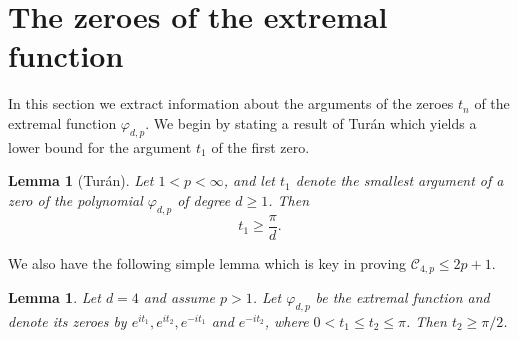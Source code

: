 \documentclass{amsart}
\theoremstyle{plain}
\newtheorem{lemma}[theorem]{Lemma}
\theoremstyle{remark}
\begin{document}
	\section{The zeroes of the extremal function}\label{sec:tn}
	In this section we extract information about the arguments of the zeroes $t_n$ of the extremal function $\varphi_{d, p}$.
	We begin by stating a result of Turán \cite[Theorem 3]{Turan} which yields a lower bound for the argument $t_1$ of the first zero.
	\begin{lemma}[Turán]\label{lem:Turan}
		Let $1 <p < \infty$, and let $t_1$ denote the smallest argument of a zero of the polynomial $\varphi_{d, p}$ of degree $d \geq 1$. Then
		\[t_1 \geq \frac{\pi}{d}.\]
	\end{lemma}
	We also have the following simple lemma which is key in proving $\mathscr{C}_{4,p} \leq 2p+1$.
	
	\begin{lemma}\label{lem:d4pi2}
		Let $d=4$ and assume $p > 1$. Let $\varphi_{d,p}$ be the extremal function and denote its zeroes by $e^{it_1}, e^{i t_2}, e^{-it_1}$ and $e^{-it_2}$, where $0 <t_1 \leq t_2 \leq \pi$. Then $t_2 \geq \pi /2$. 
	\end{lemma}
	
\end{document}
